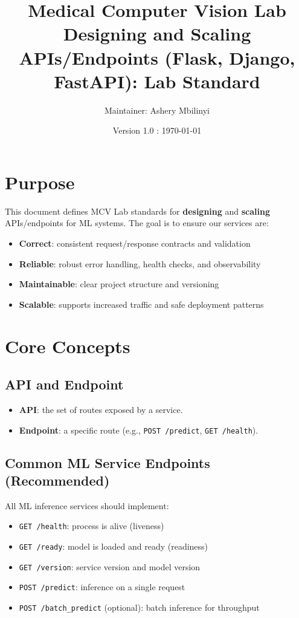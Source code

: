 \documentclass[11pt]{article}
\title{\textbf{Medical Computer Vision Lab \\ \small{
Designing and Scaling APIs/Endpoints (Flask, Django, FastAPI): Lab Standard}}}
\author{Maintainer: Ashery Mbilinyi}
\date{Version 1.0 : \today}
\begin{document}
\maketitle

\tableofcontents
\newpage

\section{Purpose}
This document defines MCV Lab standards for \textbf{designing} and \textbf{scaling} APIs/endpoints for ML systems.
The goal is to ensure our services are:
\begin{itemize}
  \item \textbf{Correct}: consistent request/response contracts and validation
  \item \textbf{Reliable}: robust error handling, health checks, and observability
  \item \textbf{Maintainable}: clear project structure and versioning
  \item \textbf{Scalable}: supports increased traffic and safe deployment patterns
\end{itemize}

\section{Core Concepts}

\subsection{API and Endpoint}
\begin{itemize}
  \item \textbf{API}: the set of routes exposed by a service.
  \item \textbf{Endpoint}: a specific route (e.g., \texttt{POST /predict}, \texttt{GET /health}).
\end{itemize}

\subsection{Common ML Service Endpoints (Recommended)}
All ML inference services should implement:
\begin{itemize}
  \item \texttt{GET /health}: process is alive (liveness)
  \item \texttt{GET /ready}: model is loaded and ready (readiness)
  \item \texttt{GET /version}: service version and model version
  \item \texttt{POST /predict}: inference on a single request
  \item \texttt{POST /batch\_predict} (optional): batch inference for throughput
\end{itemize}
\end{document}
